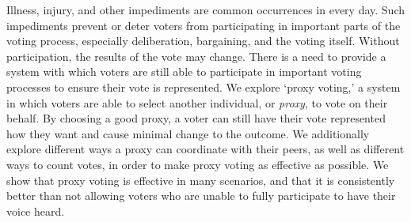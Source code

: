 %
%
%

\begin{publicabstract}

    Illness, injury, and other impediments are common occurrences in every day.
    Such impediments prevent or deter voters from participating in important parts
    of the voting process, especially deliberation, bargaining, and the voting
    itself.
    Without participation, the results of the vote may change.
    There is a need to provide a system with which voters are still able to
    participate in important voting processes to ensure their vote is represented.
    We explore `proxy voting,' a system in which voters are able to select another
    individual, or \textit{proxy}, to vote on their behalf.
    By choosing a good proxy, a voter can still have their vote represented how they
    want and cause minimal change to the outcome.
    We additionally explore different ways a proxy can coordinate with their peers,
    as well as different ways to count votes, in order to make proxy voting as
    effective as possible.
    We show that proxy voting is effective in many scenarios, and that it is
    consistently better than not allowing voters who are unable to fully participate to
    have their voice heard.

\end{publicabstract}


